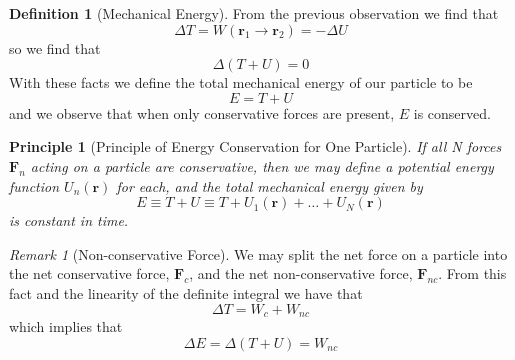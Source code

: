 \documentclass[12pt]{article}
\newtheorem{pri}[thm]{Principle}
\theoremstyle{definition}
\newtheorem{defn}[thm]{Definition}
\theoremstyle{remark}
\newtheorem{rmk}[thm]{Remark}
\numberwithin{equation}{section}
\newcommand\B[1]{\textbf{#1}}
\begin{document}
\vspace{15pt}

\begin{defn}[Mechanical Energy]
        From the previous observation we find that \begin{equation}
                \Delta T = W(\B{r}_1 \rightarrow \B{r}_2) = -\Delta U
        \end{equation}
        so we find that \begin{equation}
                \Delta (T + U) = 0
        \end{equation}
        With these facts we define the total mechanical energy of our particle to be \begin{equation}
                E = T+U
        \end{equation}
        and we observe that when only conservative forces are present, $E$ is conserved.
\end{defn}


\vspace{15pt}

\begin{pri}[Principle of Energy Conservation for One Particle]
        If all N forces $\B{F}_n$ acting on a particle are conservative, then we may define a potential energy function $U_n(\B{r})$ for each, and the total mechanical energy given by \begin{equation}
                E \equiv T + U \equiv T + U_1(\B{r}) + \hdots + U_N(\B{r})
        \end{equation}
        is constant in time.
\end{pri}

\vspace{15pt}

\begin{rmk}[Non-conservative Force]
        We may split the net force on a particle into the net conservative force, $\B{F}_c$, and the net non-conservative force, $\B{F}_{nc}$. From this fact and the linearity of the definite integral we have that \begin{equation}
                \Delta T = W_c + W_{nc}
        \end{equation}
        which implies that \begin{equation}
                \Delta E = \Delta(T + U) = W_{nc}
        \end{equation}
\end{rmk}

\vspace{15pt}
\end{document}
